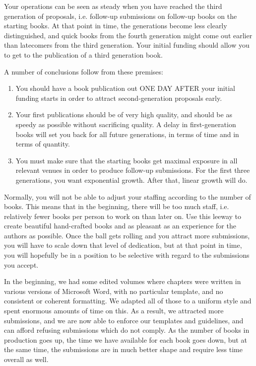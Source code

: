\documentclass[nonflat,modfonts,output=book] {langsci/langscibook}
\begin{document}
Your operations can be seen as steady when you have reached the third generation of proposals, i.e. follow-up submissions on follow-up books on the starting books. At that point in time, the generations become less clearly distinguished, and quick books from the fourth generation might come out earlier than latecomers from the third generation. Your initial funding should allow you to get to the publication of a third generation book.

A number of conclusions follow from these premises:

\begin{enumerate}
 \item You should have a book publication out ONE DAY AFTER your initial funding starts in order to attract second-generation proposals early. 
 \item Your first publications should be of very high quality, and should be as speedy as possible without sacrificing quality. A delay in first-generation books will set you back for all future generations, in terms of time and in terms of quantity.
 \item You must make sure that the starting books get maximal exposure in all relevant venues in order to produce follow-up submissions. For the first three generations, you want exponential growth. After that, linear growth will do. 
\end{enumerate}

Normally, you will not be able to adjust your staffing according to the number of books. This means that in the beginning, there will be too much staff, i.e. relatively fewer books per person to work on than later on. Use this leeway to create beautiful hand-crafted books and as pleasant as an experience for the authors as possible. Once the ball gets rolling and you attract more submissions, you will have to scale down that level of dedication, but at that point in time, you will hopefully be in a position to be selective with regard to the submissions you accept. 

In the beginning, we had some edited volumes where chapters were written in various versions of Microsoft Word, with no particular template, and no consistent or coherent formatting. We adapted all of those to a uniform style and spent enormous amounts of time on this. As a result, we attracted more submissions, and we are now able to enforce our templates and guidelines, and can afford refusing submissions which do not comply. As the number of books in production goes up, the time we have available for each book goes down, but at the same time, the submissions are in much better shape and require less time overall as well. 
\end{document}

